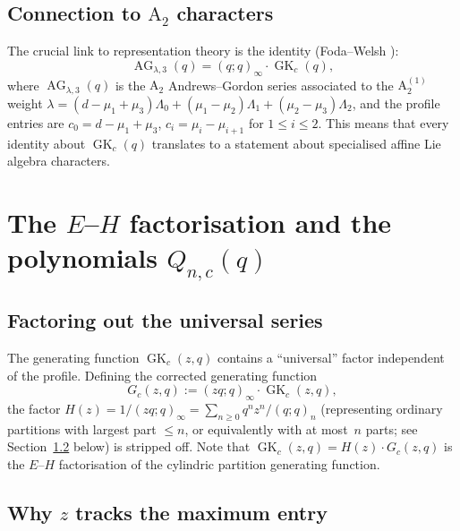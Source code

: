 \documentclass[11pt]{article}
\theoremstyle{plain}
\theoremstyle{definition}
\newcommand{\GK}{\operatorname{GK}}
\newcommand{\AG}{\operatorname{AG}}
\newcommand{\qpoch}[2]{(#1;#2)_\infty}
\newcommand{\qpochn}[3]{(#1;#2)_{#3}}
\begin{document}
\subsection{Connection to $\mathrm{A}_2$ characters}

The crucial link to representation theory is the identity (Foda--Welsh \cite{FW}):
\begin{equation}
  \AG_{\lambda,3}(q) = \qpoch{q}{q} \cdot \GK_c(q),
  \label{eq:AG-GK}
\end{equation}
where $\AG_{\lambda,3}(q)$ is the $\mathrm{A}_2$ Andrews--Gordon series associated
to the $\mathrm{A}_2^{(1)}$ weight
$\lambda = (d - \mu_1 + \mu_3)\Lambda_0 + (\mu_1 - \mu_2)\Lambda_1 + (\mu_2 - \mu_3)\Lambda_2$,
and the profile entries are
$c_0 = d - \mu_1 + \mu_3$, $c_i = \mu_i - \mu_{i+1}$ for $1 \leq i \leq 2$.
This means that every identity about $\GK_c(q)$ translates to a statement
about specialised affine Lie algebra characters.


\section{The $E$--$H$ factorisation and the polynomials $Q_{n,c}(q)$}
\label{sec:EH}

\subsection{Factoring out the universal series}

The generating function $\GK_c(z,q)$ contains a ``universal'' factor
independent of the profile. Defining the corrected generating function
\begin{equation}
  G_c(z,q) := \qpoch{zq}{q} \cdot \GK_c(z,q),
  \label{eq:Gc-def}
\end{equation}
the factor $H(z) = 1/\qpoch{zq}{q} = \sum_{n \geq 0} q^n z^n/\qpochn{q}{q}{n}$
(representing ordinary partitions with largest part $\leq n$, or
equivalently with at most~$n$ parts; see Section~\ref{sec:why-z-max}
below) is stripped off.
Note that $\GK_c(z,q) = H(z) \cdot G_c(z,q)$ is the $E$--$H$
factorisation of the cylindric partition generating function.

\subsection{Why $z$ tracks the maximum entry}
\label{sec:why-z-max}
\end{document}
